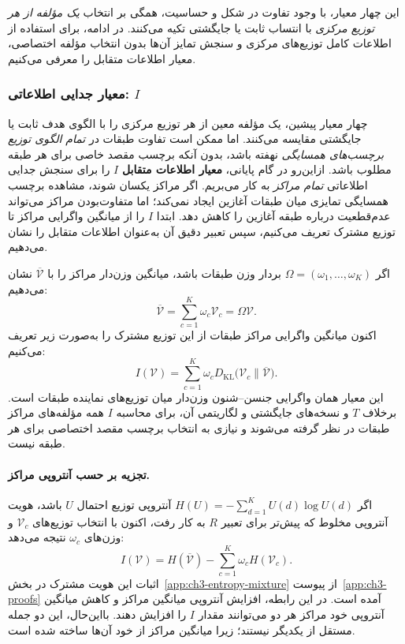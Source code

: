 این چهار معیار، با وجود تفاوت در شکل و حساسیت، همگی بر انتخاب \emph{یک مؤلفه از هر توزیع مرکزی} با انتساب ثابت یا جایگشتی تکیه می‌کنند. در ادامه، برای استفاده از اطلاعات کامل توزیع‌های مرکزی و سنجش تمایز آن‌ها بدون انتخاب مؤلفه اختصاصی، معیار اطلاعات متقابل را معرفی می‌کنیم.


\subsubsection{معیار جدایی اطلاعاتی: \texorpdfstring{$I$}{I}}
\label{subsubsec:ch3-I-criterion}
چهار معیار پیشین، یک مؤلفه معین
از هر توزیع مرکزی را با الگوی هدف
ثابت یا جایگشتی مقایسه می‌کنند.
اما ممکن است تفاوت طبقات
در \emph{تمام الگوی توزیع برچسب‌های همسایگی}
نهفته باشد، بدون آنکه برچسب مقصد
خاصی برای هر طبقه مطلوب باشد.
ازاین‌رو در گام پایانی،
\textbf{معیار اطلاعات متقابل} $I$
را برای سنجش جدایی اطلاعاتی
\emph{تمام مراکز} به کار می‌بریم.
اگر مراکز یکسان شوند، مشاهده
برچسب همسایگی تمایزی میان
طبقات آغازین ایجاد نمی‌کند؛
اما متفاوت‌بودن مراکز می‌تواند
عدم‌قطعیت درباره طبقه آغازین
را کاهش دهد. ابتدا $I$ را
از میانگین واگرایی مراکز تا
توزیع مشترک تعریف می‌کنیم،
سپس تعبیر دقیق آن به‌عنوان
اطلاعات متقابل را نشان می‌دهیم.

اگر $\Omega=(\omega_1,\ldots,\omega_K)$ بردار وزن طبقات باشد، میانگین وزن‌دار مراکز را با $\overline{\mathcal V}$ نشان می‌دهیم:
\begin{equation}\label{eq:ch3-global-center}
\overline{\mathcal V}
=\sum_{c=1}^{K}\omega_c\mathcal V_c
=\Omega\mathcal V.
\end{equation}
اکنون میانگین واگرایی مراکز طبقات از این توزیع مشترک را به‌صورت زیر تعریف می‌کنیم:
\begin{equation}\label{eq:ch3-I-on-V}
\boxed{I(\mathcal V)=
\sum_{c=1}^{K}\omega_c
D_{\mathrm{KL}}\bigl(\mathcal V_c\|\overline{\mathcal V}\bigr).}
\end{equation}
این معیار همان واگرایی جنسن--شنون وزن‌دار میان توزیع‌های نماینده طبقات است. برخلاف $T$ و نسخه‌های جایگشتی و لگاریتمی آن، برای محاسبه $I$ همه مؤلفه‌های مراکز طبقات در نظر گرفته می‌شوند و نیازی به انتخاب برچسب مقصد اختصاصی برای هر طبقه نیست.

\paragraph{تجزیه بر حسب آنتروپی مراکز.}
اگر $H(U)=-\sum_{d=1}^{K}U(d)\log U(d)$ آنتروپی توزیع احتمال $U$ باشد، هویت آنتروپی مخلوط که پیش‌تر برای تعبیر $R$ به کار رفت، اکنون با انتخاب توزیع‌های $\mathcal V_c$ و وزن‌های $\omega_c$ نتیجه می‌دهد:
\begin{equation}\label{eq:ch3-I-entropy}
\boxed{I(\mathcal V)=H(\overline{\mathcal V})
-\sum_{c=1}^{K}\omega_c H(\mathcal V_c).}
\end{equation}
اثبات این هویت مشترک در بخش~\ref{app:ch3-entropy-mixture} از پیوست~\ref{app:ch3-proofs} آمده است.
در این رابطه، افزایش آنتروپی میانگین مراکز و کاهش میانگین آنتروپی خود مراکز هر دو می‌توانند مقدار $I$ را افزایش دهند. بااین‌حال، این دو جمله مستقل از یکدیگر نیستند؛ زیرا میانگین مراکز از خود آن‌ها ساخته شده است.

